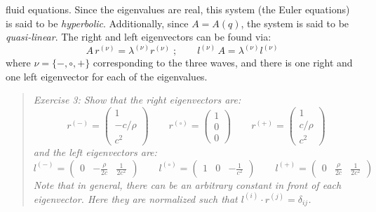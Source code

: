 \documentclass[11pt]{article}
\newcommand{\evm}{{(-)}}
\newcommand{\evz}{{(\circ)}}
\newcommand{\evp}{{(+)}}
\newcommand{\enu}{{(\nu)}}
\begin{document}
fluid equations.
Since the eigenvalues are real, this system (the Euler equations) is said
to be {\em hyperbolic}.  Additionally, since $A = A(q)$, the system is
said to be {\em quasi-linear}.  
%
The right and left eigenvectors can be found via:
\begin{equation}
A \, r^\enu = \lambda^\enu r^\enu \; ;
\qquad
l^\enu \, A  = \lambda^\enu l^\enu
\end{equation}
where $\nu = \{-,\circ,+\}$ corresponding to the three waves, and 
there is one right and one left eigenvector for each of the eigenvalues.
%
\begin{quote}
{\em Exercise 3: 
Show that the right eigenvectors are:
\begin{equation}
r^\evm = \left ( \begin{array}{c} 1 \\ -c/\rho \\ c^2 \end{array} \right )
%
\qquad
r^\evz = \left ( \begin{array}{c} 1 \\ 0 \\ 0  \end{array} \right )
%
\qquad
r^\evp = \left ( \begin{array}{c} 1 \\ c/\rho \\ c^2 \end{array} \right )
\end{equation}
and the left eigenvectors are:
\begin{equation}
l^\evm = \left ( \begin{array}{ccc} 0 & -\frac{\rho}{2c} & \frac{1}{2c^2} 
                  \end{array} \right )
%
\qquad
l^\evz = \left ( \begin{array}{ccc} 1 & 0 & -\frac{1}{c^2}  \end{array} \right )
%
\qquad
l^\evp = \left ( \begin{array}{ccc} 0 & \frac{\rho}{2c} & \frac{1}{2c^2} \end{array} \right )
\end{equation}
Note that in general, there can be an arbitrary constant in front of each
eigenvector.  Here they are normalized such that 
$l^{(i)} \cdot r^{(j)} = \delta_{ij}$.
}
\end{quote}
\end{document}
